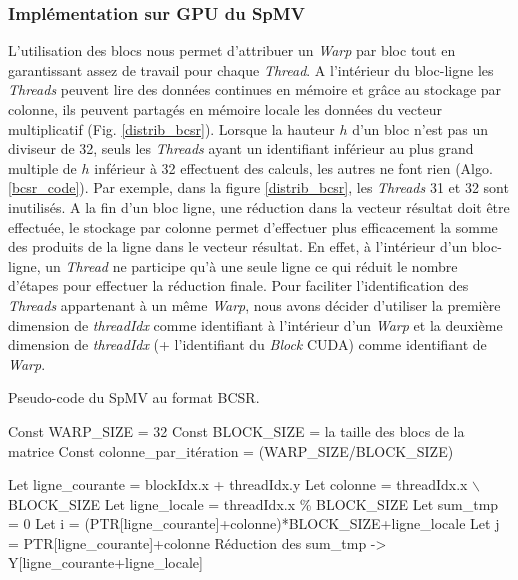 \documentclass[renpar]{compas2013}
\begin{document}
   \subsubsection{Implémentation sur GPU du SpMV}
    \label{impl_bcsr}
    L'utilisation des blocs nous permet d'attribuer un \textit{Warp} par bloc tout en garantissant
    assez de travail pour chaque \textit{Thread}. A l'intérieur du 
    bloc-ligne les \textit{Threads} peuvent lire des données continues en mémoire et grâce au
    stockage par colonne, ils peuvent partagés en mémoire locale les données
    du vecteur multiplicatif (Fig. \ref{distrib_bcsr}). Lorsque la hauteur $h$ d'un bloc n'est pas
    un diviseur de 32, seuls les \textit{Threads} ayant un identifiant inférieur au plus grand
    multiple de $h$ inférieur à 32 effectuent des calculs, les autres ne font rien (Algo. \ref{bcsr_code}).
    Par exemple, dans la figure \ref{distrib_bcsr}, les \textit{Threads} 31 et 32 sont inutilisés.
    A la fin d'un bloc ligne, une réduction dans la vecteur résultat doit être effectuée, le stockage
    par colonne permet d'effectuer plus efficacement la somme des produits de la ligne dans le 
    vecteur résultat. En effet, à l'intérieur d'un bloc-ligne, un \textit{Thread} ne participe qu'à une seule
    ligne ce qui réduit le nombre d'étapes pour effectuer la réduction finale. Pour faciliter l'identification
    des \textit{Threads} appartenant à un même \textit{Warp}, nous avons décider d'utiliser la première dimension de
    \textit{threadIdx} comme identifiant à l'intérieur d'un \textit{Warp} et la deuxième dimension de
    \textit{threadIdx} (+ l'identifiant du \textit{Block} CUDA) comme identifiant de \textit{Warp}.
    

\begin{algorithm}
 \caption{Pseudo-code du SpMV au format BCSR.}
 \label{bcsr_code}
 \SetAlgoLined
 Const WARP\_SIZE = 32\;
 Const BLOCK\_SIZE = la taille des blocs de la matrice\;
 Const colonne\_par\_itération = (WARP\_SIZE/BLOCK\_SIZE)\;

 Let ligne\_courante = blockIdx.x + threadIdx.y\;
 Let colonne = threadIdx.x $\backslash$ BLOCK\_SIZE\;
 Let ligne\_locale = threadIdx.x \% BLOCK\_SIZE\;
 Let sum\_tmp = 0\;
 Let i = (PTR[ligne\_courante]+colonne)*BLOCK\_SIZE+ligne\_locale\;
 Let j = PTR[ligne\_courante]+colonne\;
 Réduction des sum\_tmp -> Y[ligne\_courante+ligne\_locale]\;
\end{algorithm}
    
\end{document}
